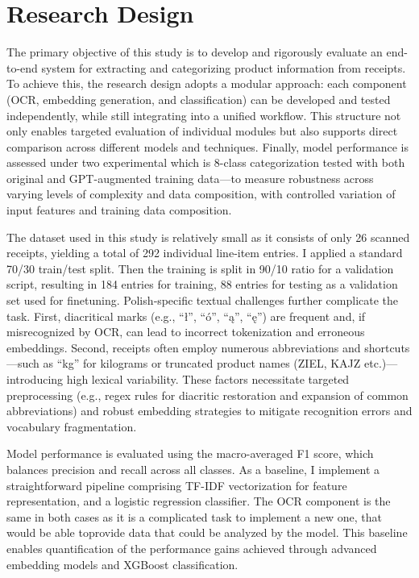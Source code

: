 \documentclass{SGGW-thesis-EN}
\begin{document}
\section{Research Design}
The primary objective of this study is to develop and rigorously evaluate an end-to-end system for extracting and categorizing product information from receipts. 
To achieve this, the research design adopts a modular approach: each component (OCR, embedding generation, and classification) can be developed and tested independently, 
while still integrating into a unified workflow. 
This structure not only enables targeted evaluation of individual modules but also supports direct comparison across different models and techniques. 
Finally, model performance is assessed under two experimental which is 8-class categorization tested with both original and GPT-augmented training data—to measure robustness across varying levels of complexity and data composition, 
 with controlled variation of input features and training data composition.

The dataset used in this study is relatively small as it consists of only 26 scanned receipts, yielding a total of 292 individual line‐item entries. 
I applied a standard 70/30 train/test split. Then the training is split in 90/10 ratio for a validation script, resulting in 184 entries for training, 88 entries for testing as a validation set used for finetuning.
Polish‐specific textual challenges further complicate the task. First, diacritical marks (e.g., “ł”, “ó”, “ą”, “ę”) are frequent and, 
if misrecognized by OCR, can lead to incorrect tokenization and erroneous embeddings. 
Second, receipts often employ numerous abbreviations and shortcuts—such as “kg” for kilograms or truncated product names (ZIEL, KAJZ etc.)—
introducing high lexical variability. These factors necessitate targeted preprocessing 
(e.g., regex rules for diacritic restoration and expansion of common abbreviations) and robust embedding strategies to mitigate recognition errors and vocabulary fragmentation.

Model performance is evaluated using the macro-averaged F1 score, which balances precision and recall across all classes. 
As a baseline, I implement a straightforward pipeline comprising TF-IDF vectorization for feature representation, 
and a logistic regression classifier. The OCR component is the same in both cases as it is a complicated task to implement a new one, 
that would be able toprovide data that could be analyzed by the model.
This baseline enables quantification of the performance gains achieved through advanced embedding models and XGBoost classification.
\end{document}
